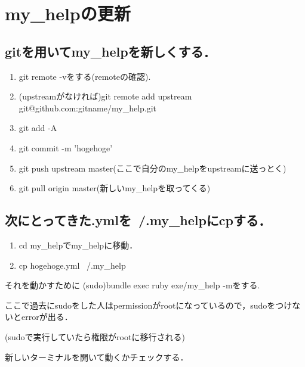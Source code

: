 \section{my\_helpの更新}
\subsection{gitを用いてmy\_helpを新しくする．}
\begin{enumerate}
\item git remote -vをする(remoteの確認).
\item (upstreamがなければ)git remote add upstream git@github.com:gitname/my\_help.git
\item git add -A
\item git commit -m 'hogehoge'
\item git push upstream master(ここで自分のmy\_helpをupstreamに送っとく)
\item git pull origin master(新しいmy\_helpを取ってくる)
\end{enumerate}
\subsection{次にとってきた.ymlを~/.my\_helpにcpする．}
\begin{enumerate}
\item cd my\_helpでmy\_helpに移動．
\item cp hogehoge.yml ~/.my\_help
\end{enumerate}
それを動かすために
(sudo)bundle exec ruby exe/my\_help -mをする.

ここで過去にsudoをした人はpermissionがrootになっているので，sudoをつけないとerrorが出る．

(sudoで実行していたら権限がrootに移行される)

新しいターミナルを開いて動くかチェックする．

